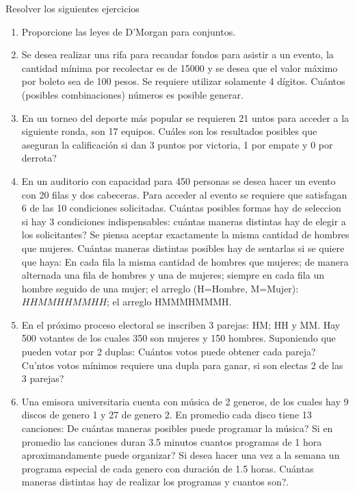 \begin{Ejer} Resolver los siguientes ejercicios
\begin{enumerate}

\item Proporcione las leyes de D'Morgan para conjuntos.


\item Se desea realizar una rifa para recaudar fondos para asistir a un evento, la cantidad m\'inima por recolectar es de 15000 y se desea que el valor m\'aximo por boleto sea de 100 pesos. Se requiere utilizar solamente 4 d\'igitos. Cu\'antos (posibles combinaciones) n\'umeros es posible generar.


\item En un torneo del deporte m\'as popular se requieren 21 untos para acceder a la siguiente ronda, son 17 equipos.  Cu\'ales
son los resultados posibles que aseguran la calificaci\'on si dan 3 puntos por victoria, 1 por empate y 0 por derrota?


\item En un auditorio con capacidad para 450 personas se desea hacer un evento con 20 filas y dos cabeceras. Para acceder al evento se requiere que satisfagan 6 de las 10 condiciones solicitadas.  Cu\'antas posibles formas hay de seleccion si hay 3 condiciones indispensables: cu\'antas maneras distintas hay de elegir a los solicitantes? Se piensa aceptar exactamente la misma cantidad de hombres que mujeres. Cu\'antas maneras distintas posibles hay de sentarlas si se quiere que haya:  En cada fila la misma cantidad de hombres que mujeres; de manera alternada una fila de hombres y una de mujeres; siempre en cada fila un hombre seguido de una mujer; el arreglo (H=Hombre, M=Mujer): $HHMMHHMMHH$; el arreglo HMMMHMMMH.


\item En el pr\'oximo proceso electoral se inscriben 3 parejas: HM; HH y MM. Hay 500 votantes de los cuales 350 son mujeres y 150 hombres. Suponiendo que pueden votar por 2 duplas: Cu\'antos votos puede obtener cada pareja? Cu\a'ntos votos m\'inimos requiere una dupla para ganar, si son electas 2 de las 3 parejas?


\item Una emisora universitaria cuenta con m\'usica de 2 generos, de los cuales hay 9 discos de genero 1 y 27 de genero 2. En promedio cada disco tiene 13 canciones: De cu\'antas maneras posibles puede programar la m\'usica?   Si en promedio las canciones duran 3.5 minutos cuantos programas de 1 hora aproximandamente puede organizar?  Si desea hacer una vez a la semana un programa especial de cada genero con duraci\'on de 1.5 horas.  Cu\'antas maneras distintas hay de realizar los programas y cuantos son?.



\end{enumerate}
\end{Ejer}
